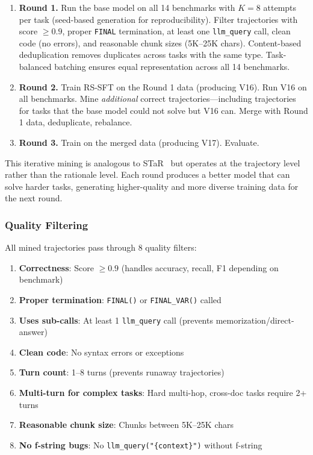 \documentclass{article}
\begin{document}
\begin{enumerate}
    \item \textbf{Round 1.} Run the base model on all 14 benchmarks with $K{=}8$ attempts per task (seed-based generation for reproducibility). Filter trajectories with score $\geq 0.9$, proper \texttt{FINAL} termination, at least one \texttt{llm\_query} call, clean code (no errors), and reasonable chunk sizes (5K--25K chars). Content-based deduplication removes duplicates across tasks with the same type. Task-balanced batching ensures equal representation across all 14 benchmarks.
    \item \textbf{Round 2.} Train RS-SFT on the Round 1 data (producing V16). Run V16 on all benchmarks. Mine \emph{additional} correct trajectories---including trajectories for tasks that the base model could not solve but V16 can. Merge with Round 1 data, deduplicate, rebalance.
    \item \textbf{Round 3.} Train on the merged data (producing V17). Evaluate.
\end{enumerate}

This iterative mining is analogous to STaR~\cite{zelikman2022star} but operates at the trajectory level rather than the rationale level. Each round produces a better model that can solve harder tasks, generating higher-quality and more diverse training data for the next round.

\subsubsection{Quality Filtering}

All mined trajectories pass through 8 quality filters:
\begin{enumerate}
    \item \textbf{Correctness}: Score $\geq 0.9$ (handles accuracy, recall, F1 depending on benchmark)
    \item \textbf{Proper termination}: \texttt{FINAL()} or \texttt{FINAL\_VAR()} called
    \item \textbf{Uses sub-calls}: At least 1 \texttt{llm\_query} call (prevents memorization/direct-answer)
    \item \textbf{Clean code}: No syntax errors or exceptions
    \item \textbf{Turn count}: 1--8 turns (prevents runaway trajectories)
    \item \textbf{Multi-turn for complex tasks}: Hard multi-hop, cross-doc tasks require 2+ turns
    \item \textbf{Reasonable chunk size}: Chunks between 5K--25K chars
    \item \textbf{No f-string bugs}: No \texttt{llm\_query("\{context\}")} without f-string
\end{enumerate}
\end{document}
